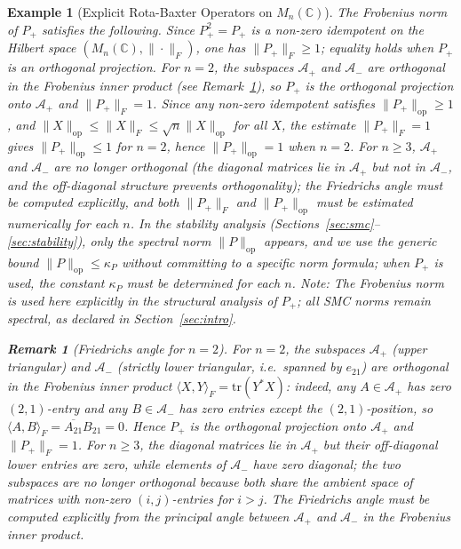 \documentclass[10pt]{amsart}
\newcommand{\Ac}{\mathcal{A}}
\numberwithin{equation}{section}
\newtheorem{remark}[theorem]{Remark}
\newtheorem{example}[theorem]{Example}
\begin{document}
\begin{example}[Explicit Rota-Baxter Operators on \(M_n(\mathbb{C})\)]
The Frobenius norm of $P_+$ satisfies the following. Since $P_+^2 = P_+$ is a non-zero
idempotent on the Hilbert space $(M_n(\mathbb{C}), \|\cdot\|_F)$, one has
$\|P_+\|_F \geq 1$; equality holds when $P_+$ is an orthogonal projection. For $n=2$,
the subspaces $\Ac_+$ and $\Ac_-$ are orthogonal in the Frobenius inner product (see
Remark~\ref{rem:friedrichs}), so $P_+$ is the orthogonal projection onto $\Ac_+$ and
$\|P_+\|_F = 1$. Since any non-zero idempotent satisfies $\|P_+\|_{\mathrm{op}} \geq 1$,
and $\|X\|_{\mathrm{op}} \leq \|X\|_F \leq \sqrt{n}\|X\|_{\mathrm{op}}$ for all $X$,
the estimate $\|P_+\|_F = 1$ gives $\|P_+\|_{\mathrm{op}} \leq 1$ for $n=2$, hence
$\|P_+\|_{\mathrm{op}} = 1$ when $n=2$. For $n \geq 3$, $\Ac_+$ and $\Ac_-$ are no
longer orthogonal (the diagonal matrices lie in $\Ac_+$ but not in $\Ac_-$, and the
off-diagonal structure prevents orthogonality); the Friedrichs angle must be computed
explicitly, and both $\|P_+\|_F$ and $\|P_+\|_{\mathrm{op}}$ must be estimated
numerically for each $n$. In the stability analysis
(Sections~\ref{sec:smc}--\ref{sec:stability}), only the spectral norm
$\|P\|_{\mathrm{op}}$ appears, and we use the generic bound
$\|P\|_{\mathrm{op}} \leq \kappa_P$ without committing to a specific norm formula;
when $P_+$ is used, the constant $\kappa_P$ must be determined for each $n$.
\emph{Note: The Frobenius norm is used here explicitly in the structural analysis of
$P_+$; all SMC norms remain spectral, as declared in Section~\ref{sec:intro}.}

\begin{remark}[Friedrichs angle for $n=2$]\label{rem:friedrichs}
For $n=2$, the subspaces $\Ac_+$ (upper triangular) and $\Ac_-$ (strictly lower
triangular, i.e.\ spanned by $e_{21}$) are orthogonal in the Frobenius inner product
$\langle X, Y\rangle_F = \mathrm{tr}(Y^*X)$: indeed, any $A \in \Ac_+$ has zero
$(2,1)$-entry and any $B \in \Ac_-$ has zero entries except the $(2,1)$-position, so
$\langle A, B\rangle_F = \overline{A_{21}}B_{21} = 0$. Hence $P_+$ is the orthogonal
projection onto $\Ac_+$ and $\|P_+\|_F = 1$. For $n \geq 3$, the diagonal matrices
lie in $\Ac_+$ but their off-diagonal lower entries are zero, while elements of $\Ac_-$
have zero diagonal; the two subspaces are no longer orthogonal because both share the
ambient space of matrices with non-zero $(i,j)$-entries for $i>j$. The Friedrichs angle
must be computed explicitly from the principal angle between $\Ac_+$ and $\Ac_-$ in the
Frobenius inner product.
\end{remark}


\end{example}
\end{document}
